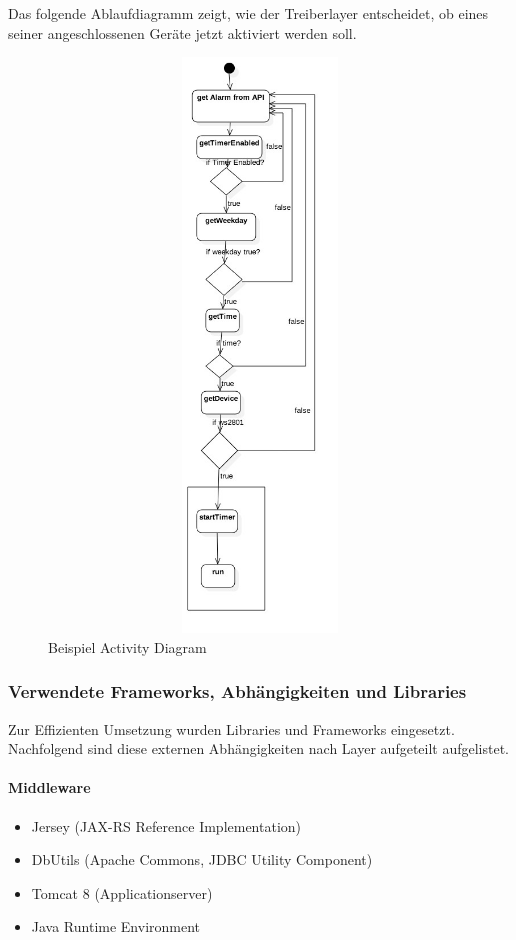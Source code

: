 \documentclass[]{article}
\providecommand{\tightlist}{%
  \setlength{\itemsep}{0pt}\setlength{\parskip}{0pt}}
\let\oldparagraph\paragraph
\renewcommand{\paragraph}[1]{\oldparagraph{#1}\mbox{}}
\begin{document}
Das folgende Ablaufdiagramm zeigt, wie der Treiberlayer entscheidet, ob
eines seiner angeschlossenen Geräte jetzt aktiviert werden soll.

\begin{figure}[H]
\centering
\includegraphics[width=6in,height=6in]{./WI61ActivityDiagramm.jpeg}
\caption{Beispiel Activity Diagram}
\end{figure}

\subsubsection{Verwendete Frameworks, Abhängigkeiten und
Libraries}\label{verwendete-frameworks-abhuxe4ngigkeiten-und-libraries}

Zur Effizienten Umsetzung wurden Libraries und Frameworks eingesetzt.
Nachfolgend sind diese externen Abhängigkeiten nach Layer aufgeteilt
aufgelistet.

\paragraph{Middleware}\label{middleware}

\begin{itemize}
\tightlist
\item
  Jersey (JAX-RS Reference Implementation)
\item
  DbUtils (Apache Commons, JDBC Utility Component)
\item
  Tomcat 8 (Applicationserver)
\item
  Java Runtime Environment
\end{itemize}
\end{document}
